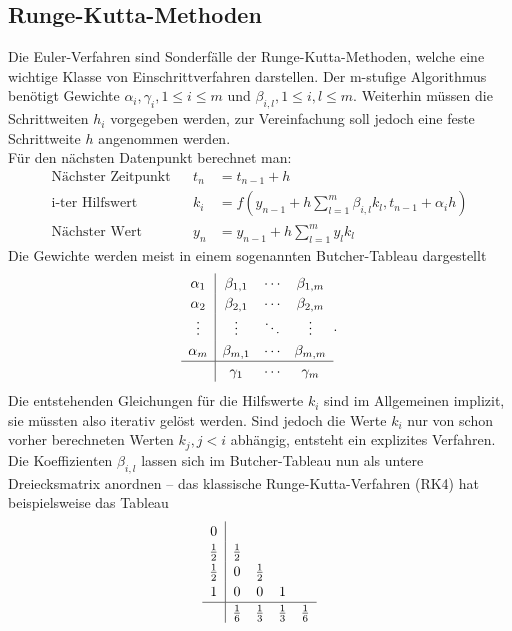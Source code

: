 \documentclass{scrartcl}
\begin{document}
\subsection{Runge-Kutta-Methoden}
Die Euler-Verfahren sind Sonderfälle der Runge-Kutta-Methoden, welche eine wichtige Klasse von Einschrittverfahren darstellen. Der m-stufige Algorithmus benötigt Gewichte $\alpha_i, \gamma_i, 1 \le i \le m$ und $\beta_{i,l}, 1\le i, l\le m$. Weiterhin müssen die Schrittweiten  $h_i$ vorgegeben werden, zur Vereinfachung soll jedoch eine feste Schrittweite $h$ angenommen werden.\\
Für den nächsten Datenpunkt berechnet man:
\begin{equation}
\begin{aligned}
	\text{Nächster Zeitpunkt} && t_n &= t_{n-1} + h \\
	\text{i-ter Hilfswert} && k_i &= f\left(y_{n-1} + h \sum_{l=1}^m \beta_{i,l}k_l, t_{n-1} + \alpha_i h\right) \\
	\text{Nächster Wert} && y_n &= y_{n-1} + h\sum_{l=1}^m y_l k_l
\end{aligned}
\end{equation}
Die Gewichte werden meist in einem sogenannten Butcher-Tableau dargestellt
\begin{equation*}
	\begin{array}{c|ccc}
	\alpha_1 	& \beta_{1,1}   & \cdots & \beta_{1,m} \\
	\alpha_2 	& \beta_{2,1}   & \cdots & \beta_{2,m} \\
	\vdots      & \vdots        & \ddots & \vdots        \\
	\alpha_m    & \beta_{m,1}   & \cdots & \beta_{m,m} \\
	\hline
	            & \gamma_1      & \cdots & \gamma_m
\end{array}.
\end{equation*}
Die entstehenden Gleichungen für die Hilfswerte $k_i$ sind im Allgemeinen implizit, sie müssten also iterativ gelöst werden. Sind jedoch die Werte $k_i$ nur von schon vorher berechneten Werten $k_j, j < i$ abhängig, entsteht ein explizites Verfahren. Die Koeffizienten $\beta_{i,l}$ lassen sich im Butcher-Tableau nun als untere Dreiecksmatrix anordnen -- das klassische Runge-Kutta-Verfahren (RK4) hat beispielsweise das Tableau
\begin{equation}
\renewcommand\arraystretch{1.2}
\begin{array}{c|cccc}
	0 &&&& \\
	\tfrac{1}{2} & \tfrac{1}{2} &&& \\
	\tfrac{1}{2} & 0 & \tfrac{1}{2} && \\
	1 & 0 & 0 & 1 &\\
	\hline
	& \tfrac{1}{6} & \tfrac{1}{3} & \tfrac{1}{3} & \tfrac{1}{6}
\end{array}
\end{equation}
\end{document}
